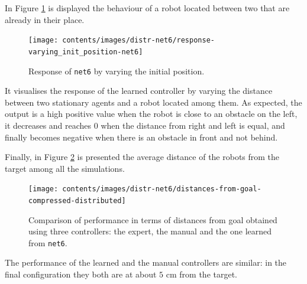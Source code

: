 In Figure \ref{fig:net6responseposition} is displayed the behaviour of a robot 
located between two that are already in their place.
\begin{figure}[!htb]
	\centering
	\texttt{[image: contents/images/distr-net6/response-varying\_init\_position-net6]}%
	\caption{Response of \texttt{net6} by varying the initial position.}
	\label{fig:net6responseposition}
\end{figure}
It visualises the response of the learned controller by varying the distance between 
two stationary agents and a robot located among them.
As expected, the output is a high positive value when the robot is close to an 
obstacle on the left, it decreases and reaches $0$ when the distance from 
right and left is equal, and finally becomes negative when there is an obstacle in 
front and not behind. 

Finally, in Figure \ref{fig:net6distance} is presented the average distance of the 
robots from the target among all the simulations. 
\begin{figure}[!htb]
	\centering
	\texttt{[image: contents/images/distr-net6/distances-from-goal-compressed-distributed]}%
		\caption[Evaluation of \texttt{net6} distances from goal.]{Comparison of 
		performance in terms of distances from goal obtained using three 
		controllers: the expert, the manual and the one learned from \texttt{net6}.}
	\label{fig:net6distance}
\end{figure}
The performance of the learned and the manual controllers are similar: in the 
final configuration they both are at about $5$ \gls{cm} from the target. 

